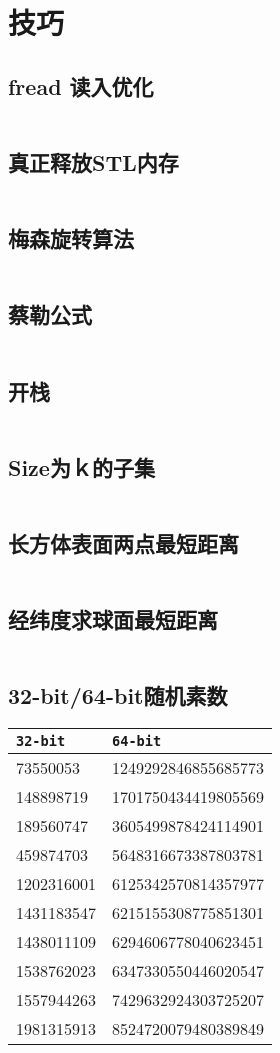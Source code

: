 \chapter{技巧}
\section{fread 读入优化}
\inputminted{cpp}{\source/hints/input-acceleration.cpp}
\section{真正释放STL内存}
\inputminted{cpp}{\source/hints/STL-memory-release.cpp}
\section{梅森旋转算法}
\inputminted{cpp}{\source/hints/mersenne-twister.cpp}
\section{蔡勒公式}
\inputminted{cpp}{\source/hints/zeller.cpp}
\section{开栈}
\inputminted{cpp}{\source/hints/openstack.cpp}
\section{Size为ｋ的子集}
\inputminted{cpp}{\source/hints/subset-of-size-k.cpp}
\section{长方体表面两点最短距离}
\inputminted{cpp}{\source/hints/长方体表面两点最短距离.cpp}
\section{经纬度求球面最短距离}
\inputminted{cpp}{\source/hints/经纬度求球面最短距离.cpp}
\section{32-bit/64-bit随机素数}
\begin{tabular}{|l|l|}
	\hline
	\texttt{32-bit} & \texttt{64-bit} \\
	\hline
	73550053 & 1249292846855685773 \\
	\hline
	148898719 & 1701750434419805569 \\
	\hline
	189560747 & 3605499878424114901 \\
	\hline
	459874703 & 5648316673387803781 \\
	\hline
	1202316001 & 6125342570814357977 \\
	\hline
	1431183547 & 6215155308775851301 \\
	\hline
	1438011109 & 6294606778040623451 \\
	\hline
	1538762023 & 6347330550446020547 \\
	\hline
	1557944263 & 7429632924303725207 \\
	\hline
	1981315913 & 8524720079480389849 \\
	\hline
\end{tabular}

